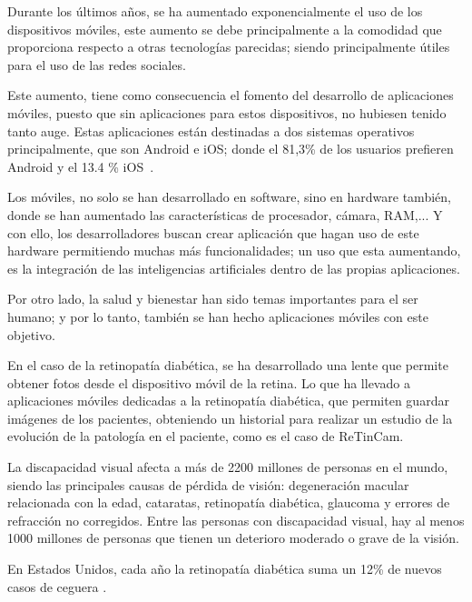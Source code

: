 
Durante los últimos años, se ha aumentado exponencialmente el uso de los dispositivos móviles, este aumento se debe principalmente a la comodidad que proporciona respecto a otras tecnologías parecidas; siendo principalmente útiles para el uso de las redes sociales. 

Este aumento, tiene como consecuencia el fomento del desarrollo de aplicaciones móviles, puesto que sin aplicaciones para estos dispositivos, no hubiesen tenido tanto auge. Estas aplicaciones están destinadas a dos sistemas operativos principalmente, que son Android e iOS; donde el 81,3\% de los usuarios prefieren Android y el 13.4 \% iOS~\cite{android-iOS}.

Los móviles, no solo se han desarrollado en software, sino en hardware también, donde se han aumentado las características de procesador, cámara, RAM,...  Y con ello, los desarrolladores buscan crear aplicación que hagan uso de este hardware permitiendo muchas más funcionalidades; un uso que esta aumentando, es la integración de las inteligencias artificiales dentro de las propias aplicaciones.

Por otro lado, la salud y bienestar han sido temas importantes para el ser humano; y por lo tanto, también se han hecho aplicaciones móviles con este objetivo.

En el caso de la retinopatía diabética, se ha desarrollado una lente que permite obtener fotos desde el dispositivo móvil de la retina. Lo que ha llevado a aplicaciones móviles dedicadas a la retinopatía diabética, que permiten guardar imágenes de los pacientes, obteniendo un historial para realizar un estudio de la evolución de la patología en el paciente, como es el caso de ReTinCam.

La discapacidad visual afecta a más de 2200 millones de personas en el mundo, siendo las principales causas de pérdida de visión: degeneración macular relacionada con la edad, cataratas, retinopatía diabética, glaucoma y errores de refracción no corregidos.
Entre las personas con discapacidad visual, hay al menos 1000 millones de personas que tienen un deterioro moderado o grave de la visión\cite{oms-ceguera}.

En Estados Unidos, cada año la retinopatía diabética suma un 12\% de nuevos casos de ceguera \cite{porcentaje-afectados-eeuu}.

